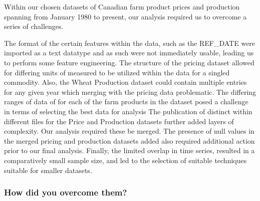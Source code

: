 Within our chosen datasets of Canadian farm product prices and production spanning from January 1980 to present, our analysis required us to overcome a series of challenges.

The format of the certain features within the data, such as the REF\_DATE were imported as a text datatype and as such were not immediately usable, leading us to perform some feature engineering.
The structure of the pricing dataset allowed for differing units of measured to be utilized within the data for a singled commodity.
Also, the Wheat Production dataset could contain multiple entries for any given year which merging with the pricing data problematic.
The differing ranges of data of for each of the farm products in the dataset posed a challenge in terms of selecting the best data for analysis
The publication of distinct within different files for the Price and Production datasets further added layers of complexity.
Our analysis required these be merged.
The presence of null values in the merged pricing and production datasets added also required additional action prior to our final analysis.
Finally, the limited overlap in time series, resulted in a comparatively small sample size, and led to the selection of suitable techniques suitable for smaller datasets.

\subsubsection{How did you overcome them?}

